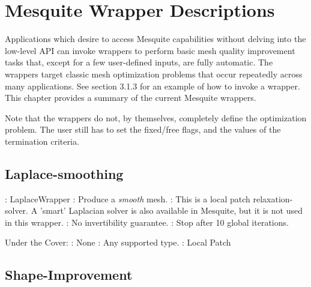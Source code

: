 \chapter{Mesquite Wrapper Descriptions}
\label{sec:wrappers}

Applications which desire to access Mesquite capabilities without delving 
into the low-level API can invoke wrappers to perform basic mesh quality 
improvement tasks that, except for a few user-defined inputs, are fully 
automatic. The wrappers target classic mesh optimization problems that occur 
repeatedly across many applications. See section 3.1.3 for an example of how
to invoke a wrapper. 
This chapter provides a summary of the current Mesquite wrappers. \newline

\noindent Note that the wrappers do not, by themselves, completely define
the optimization problem.  The user still has to set the fixed/free flags,
and the values of the termination criteria.  \newline

\section{Laplace-smoothing} \label{sec:LaplaceWrapper}

: LaplaceWrapper \newline
{}: Produce a {\it smooth} mesh. \newline
{}: This is a local patch relaxation-solver. A 'smart' 
Laplacian solver is also available in Mesquite, but it is not used in this 
wrapper.  \newline
{}: No invertibility guarantee. \newline 
{}: Stop after 10 global iterations. \newline \newline

\noindent Under the Cover: \newline
{}: None \newline
{}: Any supported type. \newline
{}: Local Patch \newline



\section{Shape-Improvement} \label{sec:ShapeImprover}

